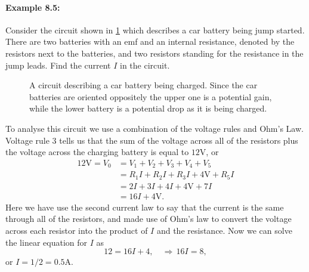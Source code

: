 \documentclass[a4paper,12pt]{book}
\begin{document}
\paragraph{Example 8.5:} Consider the circuit shown in \cref{fig: car charging} which describes a car battery being jump started. There are two batteries with an emf and an internal resistance, denoted by the resistors next to the batteries, and two resistors standing for the resistance in the jump leads. Find the current $I$ in the circuit.\\

  \begin{figure}[ht]
    \centering
    \caption{A circuit describing a car battery being charged. Since the car batteries are oriented oppositely the upper one is a potential gain, while the lower battery is a potential drop as it is being charged.}
    \label{fig: car charging}
\end{figure}

To analyse this circuit we use a combination of the voltage rules and Ohm's Law.  Voltage rule 3 tells us that the sum of the voltage across all of the resistors plus the voltage across the charging battery is equal to $12\text{V}$, or
\begin{equation*}
\begin{split}
12\text{V}=V_{0}&=V_{1}+V_{2}+V_{3}+V_{4}+V_{5}\\
&=R_{1}I+R_{2}I+R_{3}I+4\text{V}+R_{5}I\\
&=2I+3I+4I+4\text{V}+7I\\
&=16I+4\text{V}.
\end{split}
\end{equation*}
Here we have use the second current law to say that the current is the same through all of the resistors, and made use of Ohm's law to convert the voltage across each resistor into the product of $I$ and the resistance. Now we can solve the linear equation for $I$ as
\begin{equation*}
12=16I+4, \quad \Rightarrow \, 16I=8,
\end{equation*}
or $I=1/2=0.5\text{A}$.\\
\end{document}
